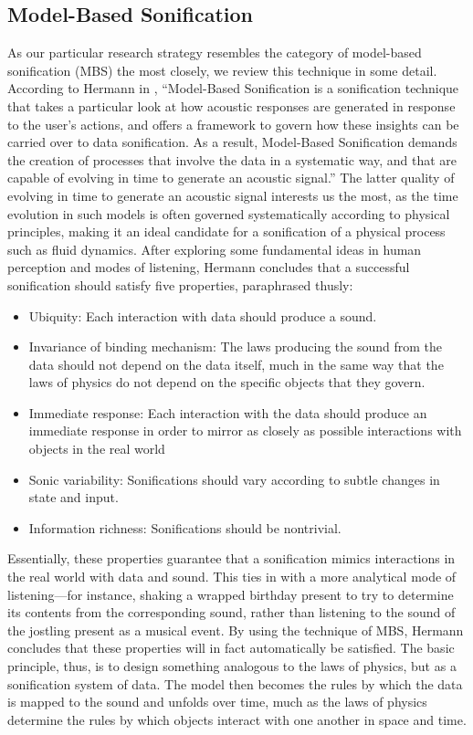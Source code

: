 \subsection{Model-Based Sonification}
\label{sec:modelbased}
As our particular research strategy resembles the category of model-based 
sonification (MBS) the most closely, we review this technique in some detail.
According to Hermann in \cite{hermann2011sonification}, ``Model-Based Sonification is a sonification technique 
that takes a
particular look at how acoustic responses are generated in response to the 
user's actions, and
offers a framework to govern how these insights can be carried over to data 
sonification. As
a result, Model-Based Sonification demands the creation of processes that 
involve the data in
a systematic way, and that are capable of evolving in time to generate an 
acoustic signal.'' The latter quality of 
evolving in time to generate an acoustic signal interests us the most, as the 
time evolution in such models is often governed systematically according to 
physical principles, making it an ideal candidate for a sonification of a 
physical process such as fluid dynamics. After exploring some fundamental 
ideas in human perception and modes of listening, Hermann concludes that a 
successful sonification should satisfy five properties, paraphrased thusly:
\begin{itemize}
	\item Ubiquity: Each interaction with data should produce a sound.
	\item Invariance of binding mechanism: The laws producing the sound from 
the data should not depend on the data itself, much in the same way that the
	laws of physics do not depend on the specific objects that they govern.
	\item Immediate response: Each interaction with the data should produce an 
immediate response in order to mirror as closely as possible interactions 
with objects in the real world
	\item Sonic variability: Sonifications should vary according to subtle 
changes in state and input.
	\item Information richness: Sonifications should be nontrivial.
\end{itemize}
Essentially, these properties guarantee that a sonification mimics 
interactions in the real world with data and sound. This ties in with a more 
analytical mode of listening---for instance, shaking a wrapped birthday 
present to try to determine its contents from the corresponding sound, rather 
than listening to the sound of the jostling present as a musical event. By 
using the technique of MBS, Hermann concludes that these properties will in 
fact automatically be satisfied. The basic principle, thus, is to design 
something analogous to the laws of physics, but as a sonification system of 
data. The model then becomes the rules by which the data is mapped to the 
sound and unfolds over time, much as the laws of physics determine the rules 
by which objects interact with one another in space and time.

